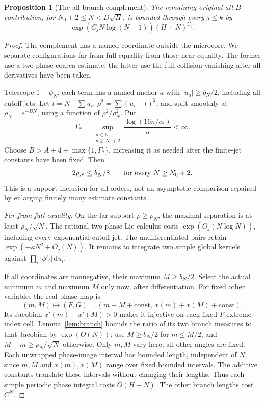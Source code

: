 \documentclass[11pt]{article}
\numberwithin{equation}{section}
\newtheorem{proposition}[theorem]{Proposition}
\theoremstyle{definition}
\newcommand{\dd}{\,\mathrm d}
\begin{document}
\begin{proposition}[The all-branch complement]\label{prop:allB}
The remaining original all-\(B\) contribution, for
\(N_0+2\le N<D\sqrt H\), is bounded through every \(j\le k\) by
\[
 \exp(C_jN\log(N+1))(H+N)^{C_j}.
\]
\end{proposition}
\begin{proof}
The complement has a named coordinate outside the microcore. We separate configurations far from full equality from those near equality. The former use a two-phase coarea estimate; the latter use the full collision vanishing after all derivatives have been taken.

Telescope \(1-\psi_N\); each term has a named anchor \(a\) with
\(|u_a|\ge b_N/2\), including all cutoff jets.
Let \(t=N^{-1}\sum u_i\), \(\rho^2=\sum(u_i-t)^2\), and split
smoothly at \(\rho_N=e^{-BN}\), using a function of
\(\rho^2/\rho_N^2\). Put
\[
 \Gamma_* = \sup_{\substack{n\in\mathbb N\\n\ge N_0+2}}
                   \frac{\log(16n/c_*)}{n}<\infty.
\]
Choose \(B>A+4+\max\{1,\Gamma_*\}\), increasing it as needed
after the finite-jet constants have been fixed. Then
\[
 2\rho_N\le b_N/8\qquad\hbox{for every }N\ge N_0+2.
\]
This is a support inclusion for all orders, not an asymptotic
comparison repaired by enlarging finitely many estimate constants.

\smallskip\noindent\textit{Far from full equality.}
On the far support \(\rho\ge\rho_N\), the maximal separation
is at least \(\rho_N/\sqrt N\). The rational two-phase Lie
calculus costs \(\exp(O_j(N\log N))\), including every exponential
cutoff jet. The undifferentiated pairs retain
\(\exp(-\kappa N^2+O_j(N))\).
It remains to integrate two simple global kernels against
\(\prod_i|\phi'_i|\dd u_i\).

If all coordinates are nonnegative, their maximum \(M\ge b_N/2\).
Select the actual minimum \(m\) and maximum \(M\) only now,
after differentiation. For fixed other variables the real phase
map is
\[
 (m,M)\longmapsto(F,G)
    =(m+M+\mathrm{const},\,x(m)+x(M)+\mathrm{const}).
\]
Its Jacobian \(x'(m)-x'(M)>0\) makes it injective on each fixed-\(F\)
extreme-index cell. Lemma~\ref{lem:branch} bounds the ratio of its
two branch measures to that Jacobian by \(\exp(O(N))\):
use \(M\ge b_N/2\) for \(m\le M/2\), and
\(M-m\ge\rho_N/\sqrt N\) otherwise.
Only \(m,M\) vary here; all other angles are fixed. Each unwrapped
phase-image interval has bounded length, independent of \(N\), since
\(m,M\) and \(x(m),x(M)\) range over fixed bounded intervals.
The additive constants translate these intervals without changing
their lengths. Thus each simple periodic phase integral costs
\(O(H+N)\). The other branch lengths cost \(C^N\).


\end{proof}
\end{document}
